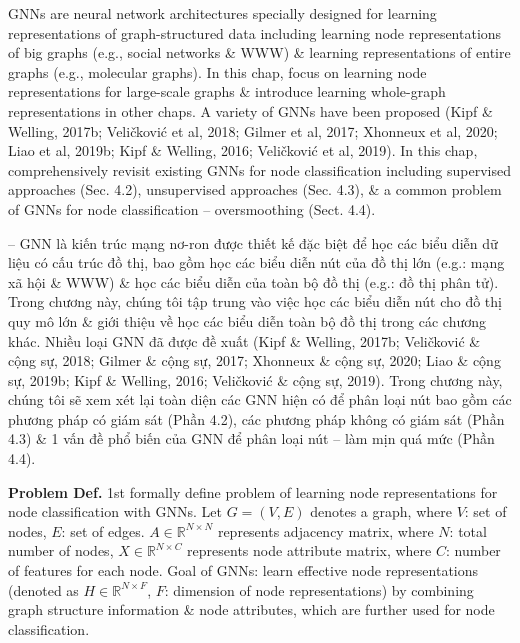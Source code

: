 \documentclass{article}
\begin{document}
\begin{itemize}
\begin{itemize}
        GNNs are neural network architectures specially designed for learning representations of graph-structured data including learning node representations of big graphs (e.g., social networks \& WWW) \& learning representations of entire graphs (e.g., molecular graphs). In this chap, focus on learning node representations for large-scale graphs \& introduce learning whole-graph representations in other chaps. A variety of GNNs have been proposed (Kipf \& Welling, 2017b; Veličković et al, 2018; Gilmer et al, 2017; Xhonneux et al, 2020; Liao et al, 2019b; Kipf \& Welling, 2016; Veličković et al, 2019). In this chap, comprehensively revisit existing GNNs for node classification including supervised approaches (Sec. 4.2), unsupervised approaches (Sec. 4.3), \& a common problem of GNNs for node classification -- oversmoothing (Sect. 4.4).

        -- GNN là kiến trúc mạng nơ-ron được thiết kế đặc biệt để học các biểu diễn dữ liệu có cấu trúc đồ thị, bao gồm học các biểu diễn nút của đồ thị lớn (e.g.: mạng xã hội \& WWW) \& học các biểu diễn của toàn bộ đồ thị (e.g.: đồ thị phân tử). Trong chương này, chúng tôi tập trung vào việc học các biểu diễn nút cho đồ thị quy mô lớn \& giới thiệu về học các biểu diễn toàn bộ đồ thị trong các chương khác. Nhiều loại GNN đã được đề xuất (Kipf \& Welling, 2017b; Veličković \& cộng sự, 2018; Gilmer \& cộng sự, 2017; Xhonneux \& cộng sự, 2020; Liao \& cộng sự, 2019b; Kipf \& Welling, 2016; Veličković \& cộng sự, 2019). Trong chương này, chúng tôi sẽ xem xét lại toàn diện các GNN hiện có để phân loại nút bao gồm các phương pháp có giám sát (Phần 4.2), các phương pháp không có giám sát (Phần 4.3) \& 1 vấn đề phổ biến của GNN để phân loại nút -- làm mịn quá mức (Phần 4.4).

        {\bf Problem Def.} 1st formally define problem of learning node representations for node classification with GNNs. Let $G = (V,E)$ denotes a graph, where $V$: set of nodes, $E$: set of edges. $A\in\mathbb{R}^{N\times N}$ represents adjacency matrix, where $N$: total number of nodes, $X\in\mathbb{R}^{N\times C}$ represents node attribute matrix, where $C$: number of features for each node. Goal of GNNs: learn effective node representations (denoted as $H\in\mathbb{R}^{N\times F}$, $F$: dimension of node representations) by combining graph structure information \& node attributes, which are further used for node classification.


\end{itemize}
\end{itemize}
\end{document}

